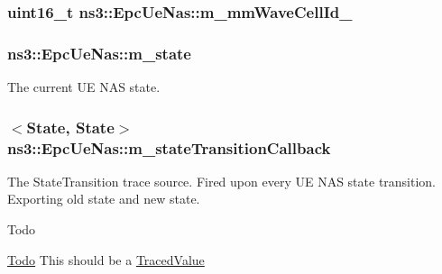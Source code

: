 \subsubsection[{\texorpdfstring{m\+\_\+mm\+Wave\+Cell\+Id\+\_\+2}{m_mmWaveCellId_2}}]{\setlength{\rightskip}{0pt plus 5cm}uint16\+\_\+t ns3\+::\+Epc\+Ue\+Nas\+::m\+\_\+mm\+Wave\+Cell\+Id\+\_\hspace{0.3cm}{\ttfamily [private]}}\hypertarget{classns3_1_1EpcUeNas_a26d12e86dd0cb5f87d92d57b6012176c}{}\label{classns3_1_1EpcUeNas_a26d12e86dd0cb5f87d92d57b6012176c}
\subsubsection[{\texorpdfstring{m\+\_\+state}{m_state}}]{ ns3\+::\+Epc\+Ue\+Nas\+::m\+\_\+state\hspace{0.3cm}{\ttfamily [private]}}\hypertarget{classns3_1_1EpcUeNas_a1717ecab2177c959111e14fdad7972d0}{}\label{classns3_1_1EpcUeNas_a1717ecab2177c959111e14fdad7972d0}


The current UE N\+AS state. 

\subsubsection[{\texorpdfstring{m\+\_\+state\+Transition\+Callback}{m_stateTransitionCallback}}]{$<${\bf State}, {\bf State}$>$ ns3\+::\+Epc\+Ue\+Nas\+::m\+\_\+state\+Transition\+Callback\hspace{0.3cm}{\ttfamily [private]}}\hypertarget{classns3_1_1EpcUeNas_a4a1b413f7ae25d1f74295fa2a76d55d3}{}\label{classns3_1_1EpcUeNas_a4a1b413f7ae25d1f74295fa2a76d55d3}
The {\ttfamily State\+Transition} trace source. Fired upon every UE N\+AS state transition. Exporting old state and new state. \begin{DoxyRefDesc}{Todo}
\item[\hyperlink{todo__todo000074}{Todo}]This should be a \hyperlink{classns3_1_1TracedValue}{Traced\+Value} \end{DoxyRefDesc}
